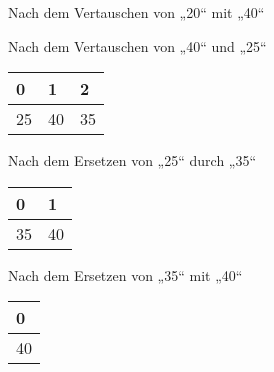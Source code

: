 \documentclass{bschlangaul-aufgabe}
\begin{document}
\begin{enumerate}
\begin{bAntwort}
\begin{bBaum}{Nach dem Vertauschen von „20“ mit „40“}
\end{bBaum}

\begin{bBaum}{Nach dem Vertauschen von „40“ und „25“}
\begin{tabular}{lll}
\bf{0} & \bf{1} & \bf{2} \\
\hline
25     & 40     & 35     \\
\end{tabular}

\end{bBaum}

%


\begin{bBaum}{Nach dem Ersetzen von „25“ durch „35“}
\begin{tabular}{ll}
\bf{0} & \bf{1} \\
\hline
35     & 40     \\
\end{tabular}

\end{bBaum}

%


\begin{bBaum}{Nach dem Ersetzen von „35“ mit „40“}
\begin{tabular}{l}
\bf{0} \\
\hline
40     \\
\end{tabular}

\end{bBaum}


\end{bAntwort}
\end{enumerate}
\end{document}
